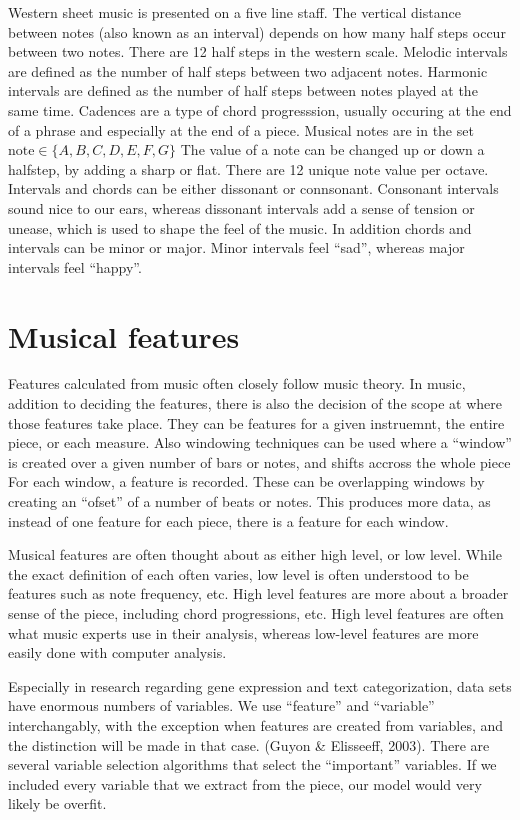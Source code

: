 \documentclass[12pt,twoside]{reedthesis}
\theoremstyle{definition}
\theoremstyle{definition}
\theoremstyle{definition}
\theoremstyle{remark}
\begin{document}
Western sheet music is presented on a five line staff. The vertical
distance between notes (also known as an interval) depends on how many
half steps occur between two notes. There are 12 half steps in the
western scale. Melodic intervals are defined as the number of half steps
between two adjacent notes. Harmonic intervals are defined as the number
of half steps between notes played at the same time. Cadences are a type
of chord progresssion, usually occuring at the end of a phrase and
especially at the end of a piece. Musical notes are in the set
\(\text{note} \in \{A,B,C,D,E,F,G\}\) The value of a note can be changed
up or down a halfstep, by adding a sharp or flat. There are 12 unique
note value per octave. Intervals and chords can be either dissonant or
connsonant. Consonant intervals sound nice to our ears, whereas
dissonant intervals add a sense of tension or unease, which is used to
shape the feel of the music. In addition chords and intervals can be
minor or major. Minor intervals feel ``sad'', whereas major intervals
feel ``happy''.

\section{Musical features}\label{musical-features}

Features calculated from music often closely follow music theory. In
music, addition to deciding the features, there is also the decision of
the scope at where those features take place. They can be features for a
given instruemnt, the entire piece, or each measure. Also windowing
techniques can be used where a ``window'' is created over a given number
of bars or notes, and shifts accross the whole piece For each window, a
feature is recorded. These can be overlapping windows by creating an
``ofset'' of a number of beats or notes. This produces more data, as
instead of one feature for each piece, there is a feature for each
window.

Musical features are often thought about as either high level, or low
level. While the exact definition of each often varies, low level is
often understood to be features such as note frequency, etc. High level
features are more about a broader sense of the piece, including chord
progressions, etc. High level features are often what music experts use
in their analysis, whereas low-level features are more easily done with
computer analysis.

Especially in research regarding gene expression and text
categorization, data sets have enormous numbers of variables. We use
``feature'' and ``variable'' interchangably, with the exception when
features are created from variables, and the distinction will be made in
that case. (Guyon \& Elisseeff, 2003). There are several variable
selection algorithms that select the ``important'' variables. If we
included every variable that we extract from the piece, our model would
very likely be overfit.
\end{document}
